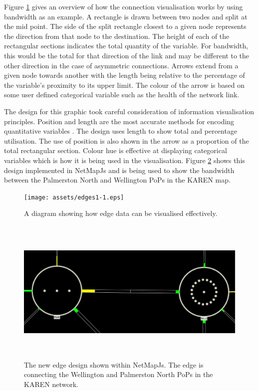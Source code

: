 \documentclass[11pt, a4paper]{report}
\begin{document}
Figure \ref{fig:edges1.1} gives an overview of how the connection visualisation
works by using bandwidth as an example. A rectangle is drawn between two nodes
and split at the mid point. The side of the split rectangle closest to a given
node represents the direction from that node to the destination. The height of
each of the rectangular sections indicates the total quantity of the variable.
For bandwidth, this would be the total for that direction of the link and may be
different to the other direction in the case of asymmetric connections. Arrows
extend from a given node towards another with the length being relative to the
percentage of the variable's proximity to its upper limit.  The colour of the
arrow is based on some user defined categorical variable such as the health of
the network link.

The design for this graphic took careful consideration of information
visualisation principles. Position and length are the most accurate methods for
encoding quantitative variables \cite{Spence_2007}. The design uses length to
show total and percentage utilisation. The use of position is also shown in the
arrow as a proportion of the total rectangular section. Colour hue is effective
at displaying categorical variables which is how it is being used in the
visualisation. Figure \ref{fig:edges1.2} shows this design implemented in
NetMapJs and is being used to show the bandwidth between the Palmerston North
and Wellington PoPs in the KAREN map.

\begin{figure}
\centering
\texttt{[image: assets/edges1-1.eps]}
\caption{A diagram showing how edge data can be visualised effectively.}
\label{fig:edges1.1}
\end{figure}

\begin{figure}
\centering
\includegraphics[width=170mm,height=70.21mm]{assets/edges1-2.eps}
\caption{The new edge design shown within NetMapJs. The edge is connecting the
Wellington and Palmerston North PoPs in the KAREN network.}
\label{fig:edges1.2}
\end{figure}
\end{document}

